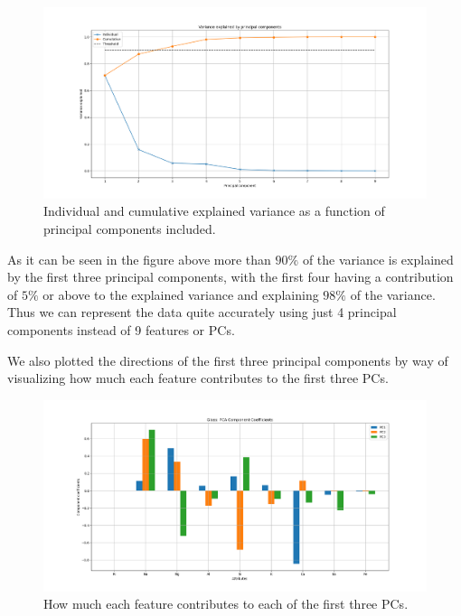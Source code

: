 \documentclass[12pt]{article}
\begin{document}
    \begin{figure}[H]
        \centering
    	\includegraphics[width=\linewidth]{image/explained_variance.png}
    	\caption{Individual and cumulative explained variance as a function of principal components included.}
    	\label{fig:explained_var}
    \end{figure}

As it can be seen in the figure above more than $90\%$ of the variance is explained by the first three principal components, with the first four having a contribution of $5\%$ or above to the explained variance and explaining $98\%$ of the variance. Thus we can represent the data quite accurately using just 4 principal components instead of 9 features or PCs.

We also plotted the directions of the first three principal components by way of visualizing how much each feature contributes to the first three PCs.

    \begin{figure}[H]
        \centering
    	\includegraphics[width=\linewidth]{image/features_PCs.png}
    	\caption{How much each feature contributes to each of the first three PCs.}
    	\label{fig:features_PCs}
    \end{figure}
    
\end{document}
